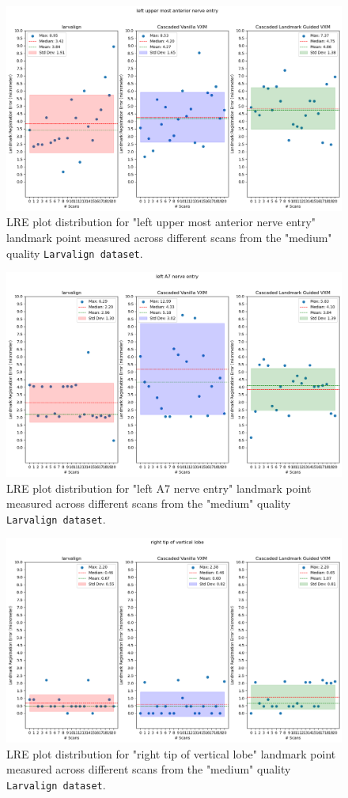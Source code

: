 	\begin{figure}[h!]
		\centering
		\includegraphics[width=0.75\columnwidth]{resources/chapter5_fresh/output/left upper most anterior nerve entry.png}
		\caption{LRE plot distribution for "left upper most anterior nerve entry" landmark point measured across different scans from the "medium" quality \texttt{Larvalign dataset}.}
		\label{fig:landmark21}
	\end{figure}

	\begin{figure}[h!]
		\centering
		\includegraphics[width=0.75\columnwidth]{resources/chapter5_fresh/output/left A7 nerve entry.png}
		\caption{LRE plot distribution for "left A7 nerve entry" landmark point measured across different scans from the "medium" quality \texttt{Larvalign dataset}.}
		\label{fig:landmark22}
	\end{figure}

	\begin{figure}[h!]
		\centering
		\includegraphics[width=0.75\columnwidth]{resources/chapter5_fresh/output/right tip of vertical lobe.png}
		\caption{LRE plot distribution for "right tip of vertical lobe" landmark point measured across different scans from the "medium" quality \texttt{Larvalign dataset}.}
		\label{fig:landmark23}
	\end{figure}

